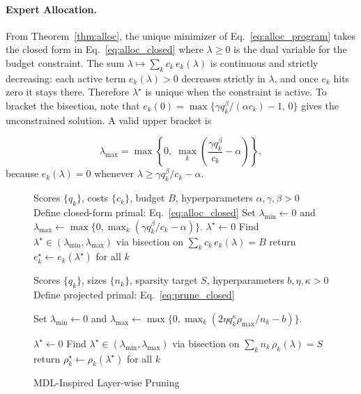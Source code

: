 \documentclass[accepted]{uai2026}%
\theoremstyle{remark}%
\begin{document}
\paragraph{Expert Allocation.}

From Theorem~\ref{thm:alloc}, the unique minimizer of Eq.~\eqref{eq:alloc_program}
takes the closed form in Eq.~\eqref{eq:alloc_closed}
where $\lambda \ge 0$ is the dual variable for the budget constraint.
The sum $\lambda \mapsto \sum_k c_k\,e_k(\lambda)$ is continuous and
strictly decreasing: each active term $e_k(\lambda) > 0$ decreases
strictly in $\lambda$, and once $e_k$ hits zero it stays there.
Therefore $\lambda^\star$ is unique when the constraint is active.
To bracket the bisection, note that
\(e_k(0) = \max\{\gamma q_k^\beta / (\alpha c_k) - 1,\,0\}\)
gives the unconstrained solution. A valid upper bracket is

\[
\lambda_{\max}
=
\max\!\left\{0,\;\max_k\left(\frac{\gamma q_k^\beta}{c_k}-\alpha\right)\right\},
\]
because $e_k(\lambda)=0$ whenever
$\lambda\ge \gamma q_k^\beta/c_k-\alpha$.
 

\begin{figure}[t]
\centering
\begin{minipage}[t]{0.48\textwidth}
\begin{algorithm}[H]
\caption{MDL-Inspired Expert Allocation}
\label{alg:alloc}
\begin{algorithmic}[1]
\REQUIRE Scores $\{q_k\}$, costs $\{c_k\}$, budget $B$, hyperparameters $\alpha,\gamma,\beta > 0$
\STATE Define closed-form primal: Eq.~\eqref{eq:alloc_closed}
\STATE 
Set $\lambda_{\min} \gets 0$ and
$\lambda_{\max} \gets \max\{0,\max_k(\gamma q_k^\beta/c_k-\alpha)\}$.
    \STATE $\lambda^\star \gets 0$ 
\ELSE
    \STATE Find $\lambda^\star \in (\lambda_{\min}, \lambda_{\max})$ via bisection on $\sum_k c_k\,e_k(\lambda) = B$
\ENDIF
\STATE return $e_k^\star \gets e_k(\lambda^\star)$ for all $k$
\end{algorithmic}
\end{algorithm}
\end{minipage}
\hfill
\begin{minipage}[t]{0.48\textwidth}
\begin{algorithm}[H]
\caption{MDL-Inspired Layer-wise Pruning}
\label{alg:prune}
\begin{algorithmic}[1]
\REQUIRE Scores $\{q_k\}$, sizes $\{n_k\}$, sparsity target $S$, hyperparameters $b,\eta,\kappa > 0$
\STATE Define projected primal: Eq.~\eqref{eq:prune_closed}
\STATE \parbox[t]{\dimexpr\linewidth-2em}{\raggedright
Set $\lambda_{\min}\gets0$ and
$\lambda_{\max}\gets\max\{0,\max_k(2\eta q_k^\kappa\rho_{\max}/n_k-b)\}$.
}\strut
{}
    \STATE $\lambda^\star \gets 0$ 
\ELSE
    \STATE Find $\lambda^\star \in (\lambda_{\min}, \lambda_{\max})$ via bisection on $\sum_k n_k\,\rho_k(\lambda) = S$
\ENDIF
\STATE return $\rho_k^\star \gets \rho_k(\lambda^\star)$ for all $k$
\end{algorithmic}
\end{algorithm}
\end{minipage}
\end{figure}
\end{document}
